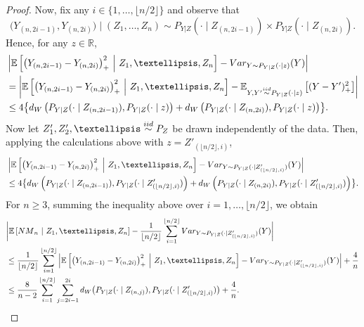 \documentclass[12pt]{article}
\newcommand{\R}{\mathbb{R}}
\newcommand{\EEst}[2]{\mathbb{E}\left[{#1}\  \middle| \ {#2}\right]}
\newcommand{\Ep}[2]{\mathbb{E}_{{#1}}\left[{#2}\right]}
\newcommand{\iidsim}{\stackrel{\textnormal{iid}}{\sim}}
\begin{document}
\begin{proof}
Now, fix any $i\in\{1,\dots,\lfloor n/2\rfloor\}$ and observe that
\[\big( Y_{(n,2i-1)}, Y_{(n,2i)}\big) \mid(Z_1,\dots,Z_n)\sim P_{Y|Z}(\cdot\mid Z_{(n,2i-1)})\times P_{Y|Z}(\cdot\mid Z_{(n,2i)}).\]
Hence, for any $z\in \R$, 
\begin{align*}
    &\left|\EEst{\left(Y_{(n,2i-1)} -Y_{(n,2i)}\right)^2_+}{Z_1,\dots,Z_n}
    - \textnormal{Var}_{Y \sim P_{Y|Z}(\cdot\mid z)}(Y)\right|\\
    &= \left|\EEst{\left(Y_{(n,2i-1)} -Y_{(n,2i)}\right)^2_+}{Z_1,\dots,Z_n}
    - \Ep{Y,Y'\iidsim P_{Y|Z}(\cdot\mid z)}{(Y-Y')^2_+}\right|\\
    &\leq 4\bigl\{{\rm d}_{\rm W}\left(P_{Y|Z}(\cdot\mid Z_{(n,2i-1)}),P_{Y|Z}(\cdot\mid z)\right)+{\rm d}_{\rm W}\left(P_{Y|Z}(\cdot\mid Z_{(n,2i)}),P_{Y|Z}(\cdot\mid z)\right)\bigr\}.
\end{align*}
Now let $Z'_1,Z'_2,\dots\iidsim P_Z$ be drawn independently of the data. Then, applying the calculations above with $z=Z'_{(\lfloor n/2\rfloor, i)}$,
\begin{align*}
    &\left|\EEst{\left(Y_{(n,2i-1)} -Y_{(n,2i)}\right)^2_+}{Z_1,\dots,Z_n}
    - \textnormal{Var}_{Y \sim P_{Y|Z}(\cdot\mid Z'_{(\lfloor n/2\rfloor, i)})}(Y)\right|\\
    &\leq 4\bigl\{{\rm d}_{\rm W}\left(P_{Y|Z}(\cdot\mid Z_{(n,2i-1)}),P_{Y|Z}(\cdot\mid Z'_{(\lfloor n/2\rfloor, i)})\right)+{\rm d}_{\rm W}\left(P_{Y|Z}(\cdot\mid Z_{(n,2i)}),P_{Y|Z}(\cdot\mid Z'_{(\lfloor n/2\rfloor, i)})\right)\bigr\}.
\end{align*}
For $n\geq 3$, summing the inequality above over $i=1,\dots,\lfloor n/2\rfloor$, we obtain
\begin{align}\label{eq:till-wasserstein-bound-neighbour-matching}
    & \biggl|\EEst{{\rm NM}_n}{Z_1,\dots,Z_n} - \frac{1}{\lfloor n/2 \rfloor} \sum_{i=1}^{\lfloor n/2\rfloor} \textnormal{Var}_{Y \sim P_{Y|Z}(\cdot\mid Z'_{(\lfloor n/2\rfloor, i)})}(Y)\biggr|\nonumber\\
    &\leq  \frac{1}{\lfloor n/2 \rfloor} \sum_{i=1}^{\lfloor n/2\rfloor}\left|\EEst{\left(Y_{(n,2i-1)} -Y_{(n,2i)}\right)^2_+}{Z_1,\dots,Z_n}
    - \textnormal{Var}_{Y \sim P_{Y|Z}(\cdot\mid Z'_{(\lfloor n/2\rfloor, i)})}(Y)\right|
    +\frac{4}{n}\nonumber\\
    &\leq \frac{8}{n-2}\sum_{i=1}^{\lfloor n/2\rfloor} \sum_{j = 2i-1}^{2i} {\rm d}_{\rm W}\big(P_{Y|Z}(\cdot\mid Z_{(n,j)}), P_{Y|Z}(\cdot\mid Z'_{(\lfloor n/2\rfloor, i)})\big)+\frac{4}{n}.
\end{align}



\end{proof}
\end{document}
